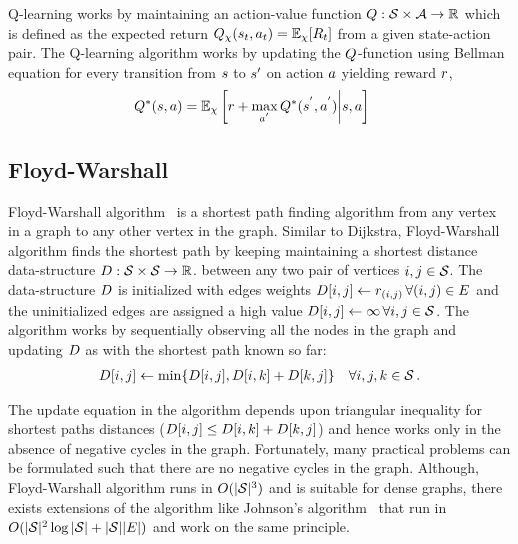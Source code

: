 Q-learning works by maintaining an action-value function $Q : \mathcal{S} \times
\mathcal{A} \rightarrow \mathbb{R}$ which is defined as the expected return
$Q_\chi(s_t, a_t) = \mathbb{E}_\chi[R_t]$ from a given state-action pair.
The Q-learning algorithm works by updating the $Q$-function using Bellman
equation for every transition from $s$ to $s'$ on action $a$
yielding reward $r$, 
%
\begin{align}
    Q^*(s, a) &= \mathbb{E}_{\chi}\left[r + \max_{a^{'}} Q^*(s^{'}, a^{'}) \middle| s, a \right] \,
    \label{eq:q-learn-bellman}
\end{align}%
%

\subsection{Floyd-Warshall}

Floyd-Warshall algorithm~\citep{floydwarshall1962} is a shortest path finding
algorithm from any vertex in a graph to any other vertex in the graph.
Similar to Dijkstra, Floyd-Warshall algorithm
finds the shortest path by keeping maintaining a shortest distance
data-structure $D : \mathcal{S} \times \mathcal{S} \rightarrow \mathbb{R}$. between any
two pair of vertices $i, j \in \mathcal{S}$.
The data-structure $D$ is initialized with edges weights
$D[i, j] \leftarrow r_{(i, j)} \, \forall (i, j) \in E$
and the uninitialized edges are assigned a high value
$D[i, j] \leftarrow \infty \, \forall i, j \in \mathcal{S}$.
The algorithm works by sequentially observing all the nodes in the graph and
updating $D$ as with the shortest path known so far:
%
\begin{align}
  D[i, j] \leftarrow \min\{ D[i, j], D[i, k] + D[k, j] \} \quad
  \forall i, j, k \in \mathcal{S} \, .
\end{align}%
%


The update equation in the algorithm depends upon triangular inequality for
shortest paths distances ($D[i, j] \le D[i, k] + D[k, j]$) and hence
works only in the absence of negative cycles in the graph. Fortunately, many
practical problems can be formulated such that there are no negative cycles
in the graph. Although, Floyd-Warshall algorithm runs in $O(|\mathcal{S}|^3)$
and is suitable for dense graphs, there exists extensions of the algorithm
like Johnson's algorithm~\citep{johnson1977efficient} that run in
$O(|\mathcal{S}|^2\log|\mathcal{S}| + |\mathcal{S}||E|)$ and work on the same
principle.

